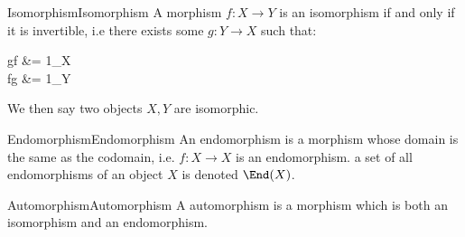 \documentclass[12pt]{article}
\begin{document}
\begin{definition}{Isomorphism}{Isomorphism}
	A morphism $f:X\to Y$ is an isomorphism if and only if it is invertible, i.e there exists some $g:Y \to X$ such that:
	\begin{niceeq}
		g\circ f &= 1_X\\
		f\circ g &= 1_Y
	\end{niceeq}
	
	We then say two objects $X,Y$ are isomorphic.
	
\end{definition}

\begin{definition}{Endomorphism}{Endomorphism}
	An endomorphism is a morphism whose domain is the same as the codomain, i.e. $f:X \to X$ is an endomorphism.
	a set of all endomorphisms of an object $X$ is denoted $\End(X)$.
\end{definition}
\begin{definition}{Automorphism}{Automorphism}
	A automorphism is a morphism which is both an isomorphism and an endomorphism.
\end{definition}
\end{document}
